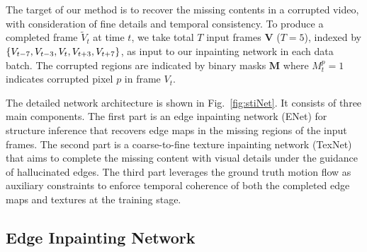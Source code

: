 The target of our method is to recover the missing contents in a corrupted video, with consideration of fine details and temporal consistency.
%
To produce a completed frame $\widetilde{V}_t$ at time $t$, we take total $T$ input frames $\boldsymbol{V}$ ($T=5$), indexed by $\{V_{t-7},V_{t-3},V_{t},V_{t+3},V_{t+7}\}$, as input to our inpainting network in each data batch. 
%
The corrupted regions are indicated by binary masks $\boldsymbol{M}$ where $M_t^p=1$ indicates corrupted pixel $p$ in frame $V_t$. 
%

% 

The detailed network architecture is shown in 
Fig.~\ref{fig:stiNet}.
It consists of three main components. 
The first part is an edge inpainting network (ENet) for structure inference that recovers edge maps in the missing regions of the input frames.
The second part is a coarse-to-fine texture inpainting network (TexNet) that aims to complete the missing content with visual details under the guidance of hallucinated edges.
The third part leverages the ground truth motion flow as auxiliary constraints to enforce temporal coherence of both the completed edge maps and textures at the training stage.













\subsection{Edge Inpainting Network}
\label{sec:edgenet}

